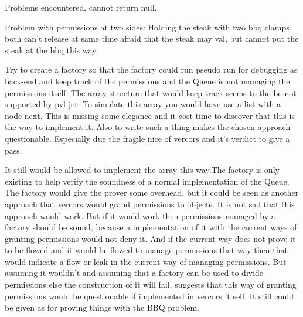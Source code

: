 
Problems encountered,
cannot return null.

Problem with permissions at two sides:
Holding the steak with two bbq clamps, both can't release at same time afraid that the steak may val, but cannot put the steak at the bbq this way.


Try to create a factory so that the factory could run pseudo run for debugging as back-end and keep track of the permissions and the Queue is not managing the permissions itself. The array structure that would keep track seems to the be not supported by pvl jet. To simulate this array you would have use a list with a node next. This is missing some elegance and it cost time to discover that this is the way to implement it. Also to write such a thing makes the chosen approach questionable. Especially due the fragile nice of vercors and it's verdict to give a pass.

It still would be allowed to implement the array this way.The factory is only existing to help verify the soundness of a normal implementation of the Queue. The factory would give the prover some overhead, but it could be seen as another approach that vercors would grand permissions to objects. It is not sad that this approach would work. But if it would work then permissions managed by a factory should be sound, because a implementation of it with the current ways of granting permissions would not deny it. And if the current way does not prove it to be flowed and it would be flowed to manage permissions that way then that would indicate a flow or leak in the current way of managing permissions. But assuming it wouldn't and assuming that a factory can be used to divide permissions else the construction of it will fail, suggests that this way of granting permissions would be questionable if implemented in vercors it self. It still could be given as for proving things with the BBQ problem.